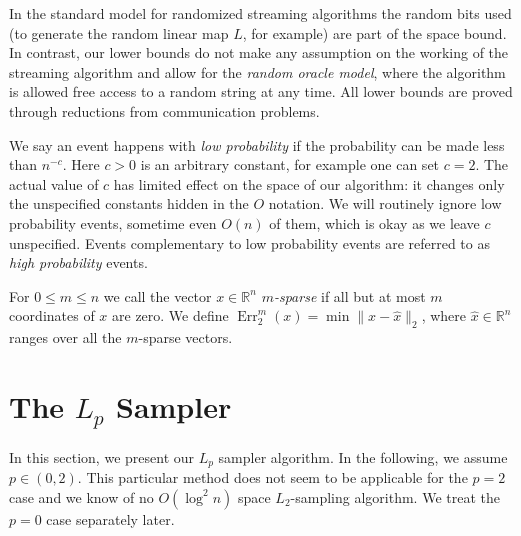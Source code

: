 \documentclass[9pt,letterpaper]{article}
\theoremstyle{remark}
\DeclareMathOperator{\err}{Err}
\begin{document}
In the standard model for randomized streaming algorithms the random bits used
(to generate the random linear map $L$, for example) are part of the space
bound. In contrast, our lower bounds do not make any assumption on the working of the
streaming algorithm and allow for the {\em random oracle model}, where the
algorithm is allowed free access to a random string at any time. All lower
bounds are proved through reductions from communication problems.

We say an event happens with {\em low probability} if the probability can
be made less than $n^{-c}$. Here $c>0$ is an arbitrary constant, for example
one can set $c=2$. The actual value of $c$ has limited effect on the space
of our algorithm: it changes only the unspecified constants hidden in the $O$
notation. We will routinely ignore low probability events, sometime even
$O(n)$ of them, which is okay as we leave $c$ unspecified.
Events complementary to low probability events are referred to as {\em high
probability} events.

For $0\le m\le n$ we call the vector $x\in\mathbb R^n$ {\em $m$-sparse} if
all but at most $m$ coordinates of $x$ are zero. We define
$\err_2^m(x)=\min\|x-\hat x\|_2$, where $\hat x\in\mathbb R^n$ ranges over all
the $m$-sparse vectors.





%
%
\section{The $L_p$ Sampler}\label{sec:lpsamp}
In this section, we present our $L_p$ sampler algorithm. In the following,
we assume  $p \in (0,2)$. This particular method does not seem to be
applicable for the $p=2$ case and we know of no $O(\log^2 n)$ space
$L_2$-sampling algorithm. We treat the $p=0$ case separately later.
\end{document}
